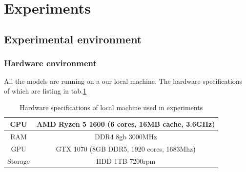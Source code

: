 \section{Experiments}
\subsection{Experimental environment}
\subsubsection{Hardware environment}
\hspace{0.5cm} All the models are running on a our local machine. The hardware specifications of which are listing in tab.\ref{tab:hardware_local}
\begin{table}[H]
\begin{center}
 \begin{tabular}{||c | c ||} 
 \hline
CPU & AMD Ryzen 5 1600 (6 cores, 16MB cache, 3.6GHz)\\
\hline
RAM & DDR4 8gb 3000MHz\\
\hline
GPU & GTX 1070 (8GB DDR5, 1920 cores, 1683Mhz) \\
\hline
Storage & HDD 1TB 7200rpm\\
 \hline
\end{tabular}
\end{center}
    \caption{Hardware specifications of local machine used in experiments}
    \label{tab:hardware_local}
\end{table}


